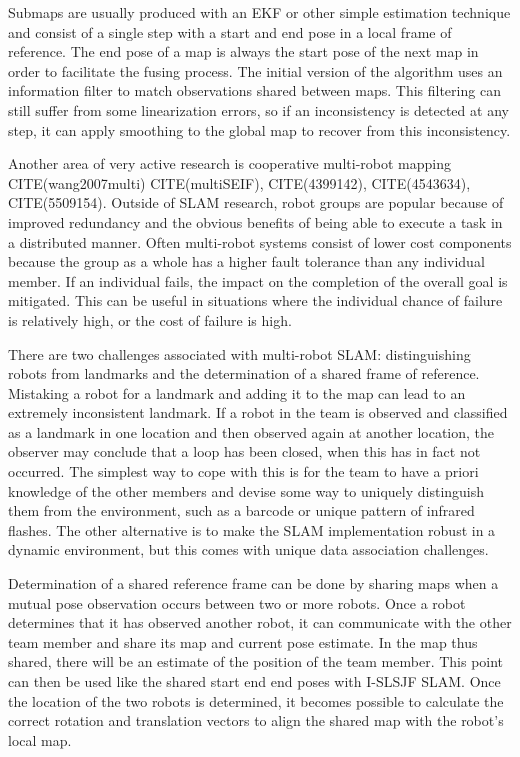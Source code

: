 \documentclass[12pt]{report}
\begin{document}
Submaps are usually produced with an EKF or other simple estimation technique and consist of a single step with a start and end pose in a local frame of reference.  The end pose of a map is always the start pose of the next map in order to facilitate the fusing process.  The initial version of the algorithm uses an information filter to match observations shared between maps.  This filtering can still suffer from some linearization errors, so if an inconsistency is detected at any step, it can apply smoothing to the global map to recover from this inconsistency.  

Another area of very active research is cooperative multi-robot mapping 
CITE(wang2007multi) CITE(multiSEIF), CITE(4399142), CITE(4543634), CITE(5509154).  
Outside of SLAM research, robot groups are popular because of improved redundancy and the obvious benefits of being able to execute a task in a distributed manner.  Often multi-robot systems consist of lower cost components because the group as a whole has a higher fault tolerance than any individual member.  If an individual fails, the impact on the completion of the overall goal is mitigated.   This can be useful in situations where the individual chance of failure is relatively high, or the cost of failure is high.  

There are two challenges associated with multi-robot SLAM: distinguishing robots from landmarks and the determination of a shared frame of reference.  Mistaking a robot for a landmark and adding it to the map can lead to an extremely inconsistent landmark.  If a robot in the team is observed and classified as a landmark in one location and then observed again at another location, the observer may conclude that a loop has been closed, when this has in fact not occurred.  The simplest way to cope with this is for the team to have a priori knowledge of the other members and devise some way to uniquely distinguish them from the environment, such as a barcode or unique pattern of infrared flashes.  The other alternative is to make the SLAM implementation robust in a dynamic environment, but this comes with unique data association challenges.

Determination of a shared reference frame can be done by sharing maps when a mutual pose observation occurs between two or more robots.  Once a robot determines that it has observed another robot, it can communicate with the other team member and share its map and current pose estimate.  In the map thus shared, there will be an estimate of the position of the team member.  This point can then be used like the shared start end end poses with I-SLSJF SLAM.  Once the location of the two robots is determined, it becomes possible to calculate the correct rotation and translation vectors to align the shared map with the robot's local map.
\end{document}
